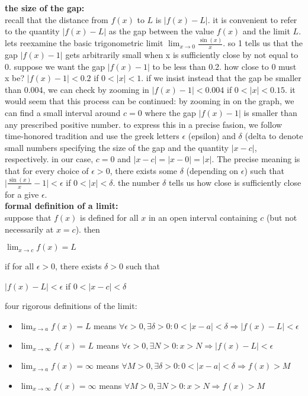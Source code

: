 \documentclass{article}
\begin{document}
\textbf{the size of the gap:}\\
recall that the distance from $f(x)$ to $L$ is $\lvert f(x) - L\rvert$. it is convenient to refer to the quantity $\lvert f(x) - L\rvert$ as the gap between the value $f(x)$ and the limit $L$. lets reexamine the basic trigonometric limit $\lim_{x \to 0}\frac{\sin(x)}{x}$. so 1 tells us that the gap $\lvert f(x) - 1\rvert$ gets arbitrarily small when x is sufficiently close by not equal to 0. suppose we want the gap $\lvert f(x) - 1\rvert$ to be less than 0.2. how close to 0 must x be? $\lvert f(x) - 1\rvert < 0.2$ if $0 < \lvert x\rvert < 1$. if we insist instead that the gap be smaller than 0.004, we can check by zooming in $\lvert f(x) - 1\rvert < 0.004$ if $0 < \lvert x\rvert < 0.15$. it would seem that this process can be continued: by zooming in on the graph, we can find a small interval around $c = 0$ where the gap $\lvert f(x) - 1\rvert$ is smaller than any prescribed positive number. to express this in a precise fasion, we follow time-honored tradition and use the greek letters $\epsilon$ (epsilon) and $\delta$ (delta to denote small numbers specifying the size of the gap and the quantity $\lvert x - c\rvert$, respectively. in our case, $c = 0$ and $\lvert x - c\rvert = \lvert x - 0\rvert = \lvert x\rvert$. The precise meaning is that for every choice of $\epsilon > 0$, there exists some $\delta$ (depending on $\epsilon$) such that $\lvert \frac{\sin(x)}{x} - 1\rvert < \epsilon$ if $0 < \lvert x\rvert < \delta$. the number $\delta$ tells us how close is sufficiently close for a give $\epsilon$.\\

\textbf{formal definition of a limit:}\\
suppose that $f(x)$ is defined for all $x$ in an open interval containing $c$ (but not necessarily at $x = c$). then
\begin{center}$\lim_{x \to c}f(x) = L$\end{center}
if for all $\epsilon > 0$, there exists $\delta > 0$ such that
\begin{center}$\lvert f(x) - L\rvert < \epsilon$ if $0 < \lvert x - c\rvert < \delta$\end{center}

four rigorous definitions of the limit:
	\begin{itemize}
		\item $\lim_{x \to a}f(x) = L$ means $\forall \epsilon > 0, \exists \delta > 0 : 0 < \lvert x - a\rvert < \delta \Rightarrow \lvert f(x) - L\rvert < \epsilon$
		\item $\lim_{x \to \infty}f(x) = L$ means $\forall \epsilon > 0, \exists N > 0 : x > N \Rightarrow \lvert f(x) - L\rvert < \epsilon$   
		\item $\lim_{x \to a}f(x) = \infty$ means $\forall M > 0, \exists \delta > 0 : 0 < \lvert x - a\rvert < \delta \Rightarrow f(x) > M$  
		\item $\lim_{x \to \infty}f(x) = \infty$ means $\forall M > 0, \exists N > 0 : x > N \Rightarrow f(x) > M$
	\end{itemize}
\end{document}
